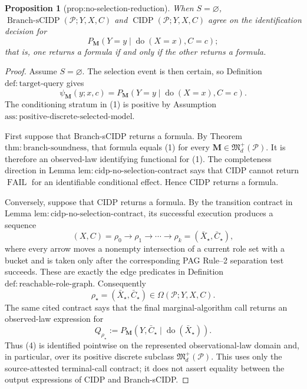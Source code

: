 \documentclass{article}
\newtheorem{proposition}{Proposition}
\begin{document}
\begin{proposition}[prop:no-selection-reduction]\label{prop:no-selection-reduction}
When \(S=\varnothing\), \(\operatorname{Branch\text{-}sCIDP}(\mathcal P;Y,X,C)\) and \(\operatorname{CIDP}(\mathcal P;Y,X,C)\) agree on the identification decision for
\[
 P_{\mathbf M}(Y=y\mid\operatorname{do}(X=x),C=c);
\]
that is, one returns a formula if and only if the other returns a formula.
\end{proposition}
\begin{proof}
Assume \(S=\varnothing\).  The selection event is then certain, so Definition \(\mathrm{def{:}target\text{-}query}\) gives
\[
 \psi_{\mathbf M}(y;x,c)
 =P_{\mathbf M}(Y=y\mid\operatorname{do}(X=x),C=c).
 \tag{1}
\]
The conditioning stratum in (1) is positive by Assumption \(\mathrm{ass{:}positive\text{-}discrete\text{-}selected\text{-}model}\).

First suppose that Branch-sCIDP returns a formula.  By Theorem \(\mathrm{thm{:}branch\text{-}soundness}\), that formula equals (1) for every \(\mathbf M\in\mathfrak M_d^+(\mathcal P)\).  It is therefore an observed-law identifying functional for (1).  The completeness direction in Lemma \(\mathrm{lem{:}cidp\text{-}no\text{-}selection\text{-}contract}\) says that CIDP cannot return \(\operatorname{FAIL}\) for an identifiable conditional effect.  Hence CIDP returns a formula.

Conversely, suppose that CIDP returns a formula.  By the transition contract in Lemma \(\mathrm{lem{:}cidp\text{-}no\text{-}selection\text{-}contract}\), its successful execution produces a sequence
\[
 (X,C)=\rho_0\longrightarrow\rho_1\longrightarrow\cdots
 \longrightarrow\rho_k=(\bar X_\star,\bar C_\star),
 \tag{2}
\]
where every arrow moves a nonempty intersection of a current role set with a bucket and is taken only after the corresponding PAG Rule--2 separation test succeeds.  These are exactly the edge predicates in Definition \(\mathrm{def{:}reachable\text{-}role\text{-}graph}\).  Consequently
\[
 \rho_\star=(\bar X_\star,\bar C_\star)
 \in\Omega(\mathcal P;Y,X,C).
 \tag{3}
\]
The same cited contract says that the final marginal-algorithm call returns an observed-law expression for
\[
 Q_{\rho_\star}
 :=P_{\mathbf M}(Y,\bar C_\star
       \mid\operatorname{do}(\bar X_\star)).
 \tag{4}
\]
Thus (4) is identified pointwise on the represented observational-law domain and, in particular, over its positive discrete subclass \(\mathfrak M_d^+(\mathcal P)\).  This uses only the source-attested terminal-call contract; it does not assert equality between the output expressions of CIDP and Branch-sCIDP.


\end{proof}
\end{document}
